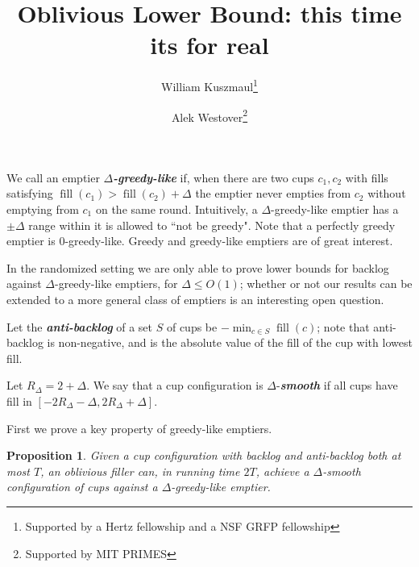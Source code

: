 \documentclass[twocolumn]{article}[10pt]
\title{Oblivious Lower Bound: this time its for real}
\date{\vspace{-5ex}}
\author[1]{\small William Kuszmaul\thanks{Supported by a Hertz fellowship and a NSF GRFP fellowship}}
\author[2]{\small Alek Westover\thanks{Supported by MIT PRIMES}}
\affil[ ]{\footnotesize MIT\textsuperscript{1}, MIT PRIMES\textsuperscript{2}}
\affil[ ]{\textit{kuszmaul@mit.edu, alek.westover@gmail.com}}
\newcommand{\defn}[1]{{\textit{\textbf{\boldmath #1}}}\xspace}
\DeclareMathOperator{\fil}{\text{fill}}
\newtheorem{proposition}{Proposition}
\begin{document}
\maketitle

We call an emptier $\Delta$\defn{-greedy-like} if, when there are two cups $c_1, c_2$ with
fills satisfying $\fil(c_1) > \fil(c_2) + \Delta$ the emptier never
empties from $c_2$ without emptying from $c_1$ on the same round. 
Intuitively, a $\Delta$-greedy-like emptier has a $\pm \Delta$ range within it is
allowed to ``not be greedy". Note that a perfectly greedy emptier is $0$-greedy-like.
Greedy and greedy-like emptiers are of great interest.

In the randomized setting we are only able to prove lower bounds for backlog
against $\Delta$-greedy-like emptiers, for $\Delta \le O(1)$; whether or not
our results can be extended to a more general class of emptiers is an
interesting open question. 

Let the \defn{anti-backlog} of a set $S$ of cups be $-\min_{c\in S} \fil(c)$;
note that anti-backlog is non-negative, and is the absolute value of the fill
of the cup with lowest fill. 

Let $R_\Delta = 2 + \Delta$. We say that a cup configuration is
$\Delta$-\defn{smooth} if all cups have fill in $[-2R_\Delta-\Delta,
2R_\Delta+\Delta]$. 

First we prove a key property of greedy-like emptiers.
\begin{proposition}
  Given a cup configuration with backlog and anti-backlog both at most $T$, an
  oblivious filler can, in running time $2T$, achieve a $\Delta$-smooth
  configuration of cups against a $\Delta$-greedy-like emptier.
\end{proposition}
\end{document}
